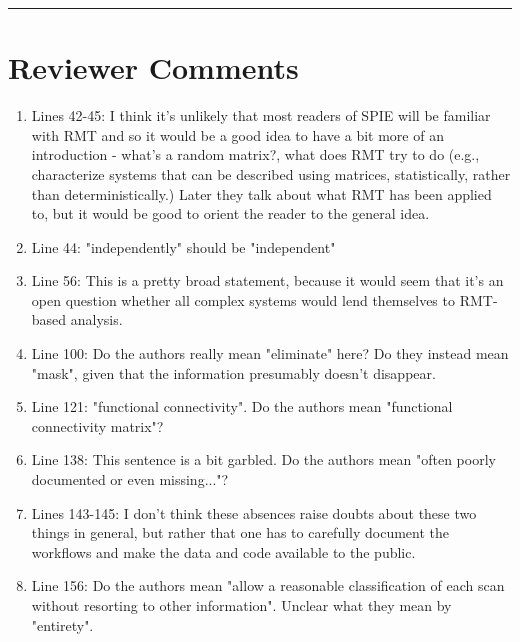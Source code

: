 \documentclass[10pt,letter]{article}
\begin{document}
\footnotesize
\begin{center}
\noindent\rule{6cm}{0.4pt}
\end{center}

\AtNextBibliography{\footnotesize}
\printbibliography[heading=none]

\section*{Reviewer Comments} \label{comments}
\begin{enumerate}
\item Lines 42-45: I think it's unlikely that most readers of SPIE will be
familiar with RMT and so it would be a good idea to have a bit more of an
introduction - what's a random matrix?, what does RMT try to do (e.g.,
characterize systems that can be described using matrices, statistically,
rather than deterministically.) Later they talk about what RMT has been applied
to, but it would be good to orient the reader to the general idea.

\item Line 44: "independently" should be "independent"

\item Line 56: This is a pretty broad statement, because it would seem that it's
an open question whether all complex systems would lend themselves to RMT-based
analysis.

\item Line 100: Do the authors really mean "eliminate" here? Do they instead mean
"mask", given that the information presumably doesn't disappear.

\item Line 121: "functional connectivity". Do the authors mean "functional
connectivity matrix"?

\item Line 138: This sentence is a bit garbled. Do the authors mean "often poorly
documented or even missing..."?

\item Lines 143-145: I don't think these absences raise doubts about these two
things in general, but rather that one has to carefully document the workflows
and make the data and code available to the public.

\item Line 156: Do the authors mean "allow a reasonable classification of each
scan without resorting to other information". Unclear what they mean by
"entirety".


\end{enumerate}
\end{document}
